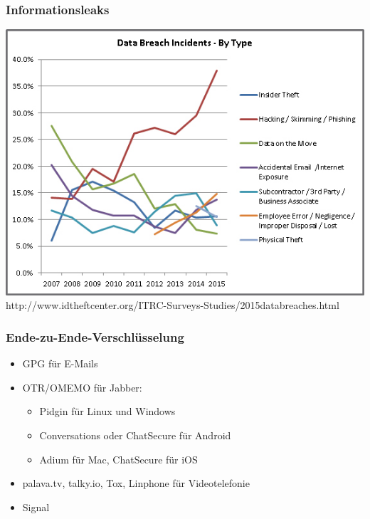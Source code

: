 \documentclass[12pt, xcolor={svgnames,table}]{beamer}
\begin{document}
\begin{frame}
    \frametitle{Informationsleaks}
    \begin{center}
      \includegraphics[height=0.7\textheight]{img/databreaches.jpg}\\
      http://www.idtheftcenter.org/ITRC-Surveys-Studies/2015databreaches.html
    \end{center}
\end{frame}

\begin{frame}
  \frametitle{Ende-zu-Ende-Verschlüsselung}
  \begin{itemize}
    \item<1-> GPG für E-Mails
    \item<2-> OTR/OMEMO für Jabber:
      \begin{itemize}
        \item Pidgin für Linux und Windows
        \item Conversations oder ChatSecure für Android
        \item Adium für Mac, ChatSecure für iOS
      \end{itemize}
    \item<3-> palava.tv, talky.io, Tox, Linphone für Videotelefonie
    \item<4-> Signal
  \end{itemize}
\end{frame}
\end{document}
